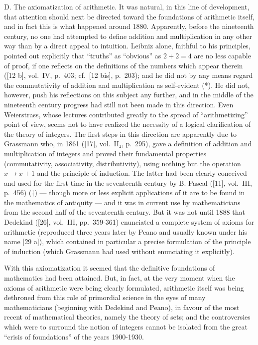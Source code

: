 D. The axiomatization of arithmetic. It was natural, in this line of development, that attention should next be directed toward the foundations of arithmetic itself, and in fact this is what happened around 1880. Apparently, before the nineteenth century, no one had attempted to define addition and multiplication in any other way than by a direct appeal to intuition. Leibniz alone, faithful to his principles, pointed out explicitly that ``truths'' as ``obvious'' as \(2 + 2 = 4\) are no less capable of proof, if one reflects on the definitions of the numbers which appear therein ({[}12 b{]}, vol.~IV, p.~403; cf.~{[}12 bis{]}, p.~203); and he did not by any means regard the commutativity of addition and multiplication as self-evident (*). He did not, however, push his reflections on this subject any further, and in the middle of the nineteenth century progress had still not been made in this direction. Even Weierstrass, whose lectures contributed greatly to the spread of ``arithmetizing'' point of view, seems not to have realized the necessity of a logical clarification of the theory of integers. The first steps in this direction are apparently due to Grassmann who, in 1861 ({[}17{]}, vol.~II₂, p.~295), gave a definition of addition and multiplication of integers and proved their fundamental properties (commutativity, associativity, distributivity), using nothing but the operation \(x \rightarrow x + 1\) and the principle of induction. The latter had been clearly conceived and used for the first time in the seventeenth century by B. Pascal ({[}11{]}, vol.~III, p.~456) (†) --- though more or less explicit applications of it are to be found in the mathematics of antiquity --- and it was in current use by mathematicians from the second half of the seventeenth century. But it was not until 1888 that Dedekind ({[}26{]}, vol.~III, pp.~359-361) enunciated a complete system of axioms for arithmetic (reproduced three years later by Peano and usually known under his name {[}29 a{]}), which contained in particular a precise formulation of the principle of induction (which Grassmann had used without enunciating it explicitly).

With this axiomatization it seemed that the definitive foundations of mathematics had been attained. But, in fact, at the very moment when the axioms of arithmetic were being clearly formulated, arithmetic itself was being dethroned from this role of primordial science in the eyes of many mathematicians (beginning with Dedekind and Peano), in favour of the most recent of mathematical theories, namely the theory of sets; and the controversies which were to surround the notion of integers cannot be isolated from the great ``crisis of foundations'' of the years 1900-1930.

